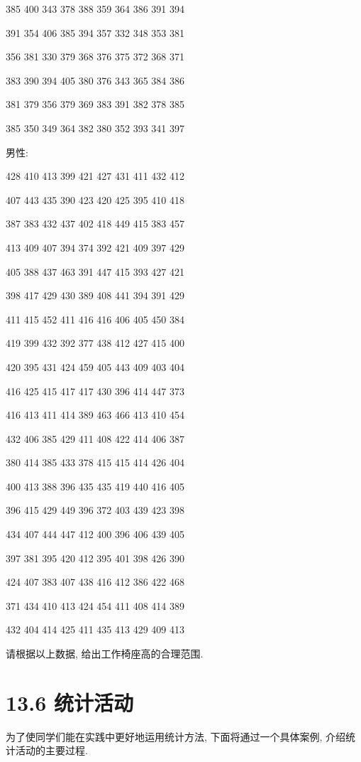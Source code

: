 \documentclass[10pt]{article}
\begin{document}
385 400 343 378 388 359 364 386 391 394

391 354 406 385 394 357 332 348 353 381

356 381 330 379 368 376 375 372 368 371

383 390 394 405 380 376 343 365 384 386

381 379 356 379 369 383 391 382 378 385

385 350 349 364 382 380 352 393 341 397

男性:

428 410 413 399 421 427 431 411 432 412

407 443 435 390 423 420 425 395 410 418

387 383 432 437 402 418 449 415 383 457

413 409 407 394 374 392 421 409 397 429

405 388 437 463 391 447 415 393 427 421

398 417 429 430 389 408 441 394 391 429

411 415 452 411 416 416 406 405 450 384

419 399 432 392 377 438 412 427 415 400

420 395 431 424 459 405 443 409 403 404

416 425 415 417 417 430 396 414 447 373

416 413 411 414 389 463 466 413 410 454

432 406 385 429 411 408 422 414 406 387

380 414 385 433 378 415 415 414 426 404

400 413 388 396 435 435 419 440 416 405

396 415 429 449 396 372 403 439 423 398

434 407 444 447 412 400 396 406 439 405

397 381 395 420 412 395 401 398 426 390

424 407 383 407 438 416 412 386 422 468

371 434 410 413 424 454 411 408 414 389

432 404 414 425 411 435 413 429 409 413

请根据以上数据, 给出工作椅座高的合理范围.



\section*{13.6 统计活动}

为了使同学们能在实践中更好地运用统计方法, 下面将通过一个具体案例, 介绍统计活动的主要过程.
\end{document}
